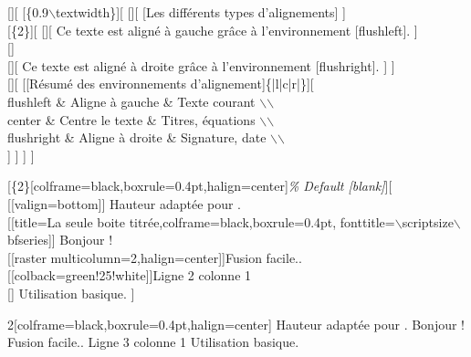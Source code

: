 [][
	 [\{0.9$\backslash$textwidth\}][
		 [][
		 	[Les différents types d'alignements]
		]\\
		[\{2\}][
			[][
				Ce texte est aligné à gauche grâce à l'environnement [flushleft].
			]\\
			[]\\
			[][
		 		Ce texte est aligné à droite grâce à l'environnement [flushright].
			]
		]\\
    [][
        [[Résumé des environnements d'alignement]\{|l|c|r|\}][
            \\
            flushleft \& Aligne à gauche \& Texte courant $\backslash$$\backslash$\\
            center \& Centre le texte \& Titres, équations $\backslash$$\backslash$\\
            flushright \& Aligne à droite \& Signature, date $\backslash$$\backslash$\\
        ]
    ]
	]
]

\newpage

[\{2\}[colframe=black,boxrule=0.4pt,halign=center]\textcolor{green!75!black}{\textit{\% Default [blank]}}][
  [[valign=bottom]] Hauteur adaptée pour .\\
  [[title=La seule boite titrée,colframe=black,boxrule=0.4pt, fonttitle=$\backslash$scriptsize$\backslash$bfseries]] Bonjour !\\
  [[raster multicolumn=2,halign=center]]Fusion facile..\\
  [[colback=green!25!white]]Ligne 2 colonne 1\\
  [] Utilisation basique.
]

\begin{MultiColonnes}{2}[colframe=black,boxrule=0.4pt,halign=center]%
  \tcbitem[valign=bottom] Hauteur adaptée pour .
  \tcbitem[title=La seule boite titrée,colframe=black,boxrule=0.4pt, fonttitle=\scriptsize\bfseries,] Bonjour !
    \tcbitem[raster multicolumn=2,halign=center] Fusion facile..
  \tcbitem[colback=green!25!white] Ligne 3 colonne 1
  \tcbitem Utilisation basique.
\end{MultiColonnes}


